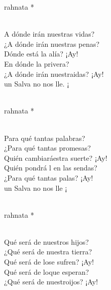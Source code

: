 \begin{cancion}%
	\begin{chorus}%
	rahnata *\\
	\end{chorus}%
	\jump\\
	A dónde irán nuestras vidas?\\
¿A dónde irán nuestras penas?\\
	Dónde está la alía? ¡Ay!\\
	En dónde la privera?\\
	¿A dónde irán nuestraidas? ¡Ay!\\
	 un Salva no nos lle. ¡\\\jump\\
	\begin{chorus}%
	rahnata *\\
	\end{chorus}%
	\jump\\
	Para qué tantas palabras?\\
¿Para qué tantas promesas?\\
	Quién cambiaráestra suerte? ¡Ay! \\
	Quién pondrá l en las sendas?\\
	¿Para qué tantas palas? ¡Ay!\\
	 un Salva no nos lle ¡\\\jump\\
	\begin{chorus}%
	rahnata *\\
	\end{chorus}%
	\jump\\
	Qué será de nuestros hijos?\\
¿Qué será de nuestra tierra?\\
	Qué será de lose sufren? ¡Ay!\\
	Qué será de loque esperan?\\
	¿Qué será de nuestroijos? ¡Ay!\\

\end{cancion}
